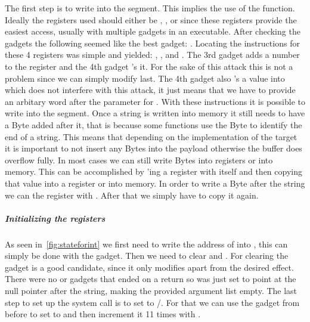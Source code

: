\documentclass[journal=tosc,submission, notanonymous]{iacrtrans}
\begin{document}
The first step is to write  into the  segment. This implies the use of the  function. Ideally the registers used should either be , ,  or  since these registers provide the easiest access, usually with multiple  gadgets in an executable. After checking the gadgets the following seemed like the best gadget: . Locating the  instructions for these 4 registers was simple and yielded: , ,  and . The 3rd gadget adds a number to the  register and the 4th gadget 's it. For the sake of this attack this is not a problem since we can simply modify  last. The 4th gadget also 's a value into  which does not interfere with this attack, it just means that we have to provide an arbitary word after the parameter for . With these instructions it is possible to write  into the  segment. Once a string is written into memory it still needs to have a  Byte added after it, that is because some  functions use the  Byte to identify the end of a string. This means that depending on the implementation of the target it is important to not insert any  Bytes into the payload otherwise the buffer does overflow fully. In most cases we can still write  Bytes into registers or into memory. This can be accomplished by 'ing a register with itself and then copying that value into a register or into memory. In order to write a  Byte after the string we can  the  register with . After that we simply have to copy it again.
\subparagraph{Initializing the registers}
As seen in~\cref{fig:stateforint} we first need to write the address of  into , this can simply be done with the  gadget. Then we need to clear  and . For clearing  the gadget  is a good candidate, since it only modifies  apart from the desired effect. There were no  or  gadgets that ended on a return so  was just set to point at the null pointer after the  string, making the provided argument list empty. The last step to set up the  system call is to set  to /. For that we can use the  gadget from before to set  to  and then increment it 11 times with .
\end{document}
